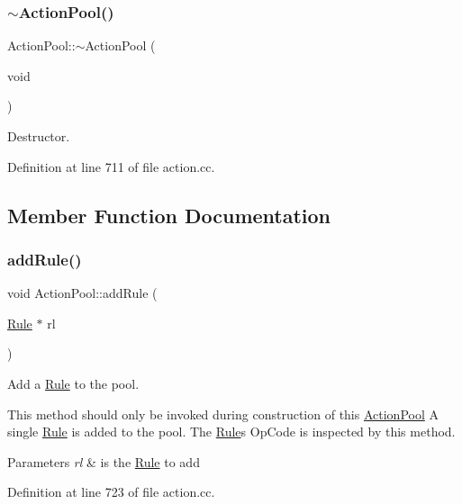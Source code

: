 \subsubsection{\texorpdfstring{$\sim$ActionPool()}{~ActionPool()}}
{\footnotesize\ttfamily Action\+Pool\+::$\sim$\+Action\+Pool (\begin{DoxyParamCaption}\item[{void}]{ }\end{DoxyParamCaption})\hspace{0.3cm}{\ttfamily [virtual]}}



Destructor. 



Definition at line 711 of file action.\+cc.



\subsection{Member Function Documentation}
\mbox{\label{class_action_pool_af8879782eac5bfb2cb748dda52760e12}} 
\subsubsection{\texorpdfstring{addRule()}{addRule()}}
{\footnotesize\ttfamily void Action\+Pool\+::add\+Rule (\begin{DoxyParamCaption}\item[{\mbox{\hyperlink{class_rule}{Rule}} $\ast$}]{rl }\end{DoxyParamCaption})}



Add a \mbox{\hyperlink{class_rule}{Rule}} to the pool. 

This method should only be invoked during construction of this \mbox{\hyperlink{class_action_pool}{Action\+Pool}} A single \mbox{\hyperlink{class_rule}{Rule}} is added to the pool. The \mbox{\hyperlink{class_rule}{Rule}}\textquotesingle{}s Op\+Code is inspected by this method. 
\begin{DoxyParams}{Parameters}
{\em rl} & is the \mbox{\hyperlink{class_rule}{Rule}} to add \\
\hline
\end{DoxyParams}


Definition at line 723 of file action.\+cc.

